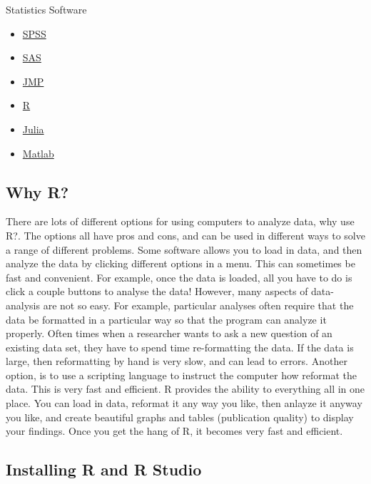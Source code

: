 \documentclass[
]{book}
\providecommand{\tightlist}{%
  \setlength{\itemsep}{0pt}\setlength{\parskip}{0pt}}
\begin{document}
Statistics Software

\begin{itemize}
\tightlist
\item
  \href{http://www-01.ibm.com/software/analytics/spss/}{SPSS}
\item
  \href{http://www.sas.com/en_us/home.html}{SAS}
\item
  \href{http://www.jmp.com}{JMP}
\item
  \href{http://www.r-project.org}{R}
\item
  \href{http://julialang.org}{Julia}
\item
  \href{http://www.mathworks.com/products/matlab/}{Matlab}
\end{itemize}

\hypertarget{why-r}{%
\subsection{Why R?}\label{why-r}}

There are lots of different options for using computers to analyze data, why use R?. The options all have pros and cons, and can be used in different ways to solve a range of different problems. Some software allows you to load in data, and then analyze the data by clicking different options in a menu. This can sometimes be fast and convenient. For example, once the data is loaded, all you have to do is click a couple buttons to analyse the data! However, many aspects of data-analysis are not so easy. For example, particular analyses often require that the data be formatted in a particular way so that the program can analyze it properly. Often times when a researcher wants to ask a new question of an existing data set, they have to spend time re-formatting the data. If the data is large, then reformatting by hand is very slow, and can lead to errors. Another option, is to use a scripting language to instruct the computer how reformat the data. This is very fast and efficient. R provides the ability to everything all in one place. You can load in data, reformat it any way you like, then anlayze it anyway you like, and create beautiful graphs and tables (publication quality) to display your findings. Once you get the hang of R, it becomes very fast and efficient.

\hypertarget{installing-r-and-r-studio}{%
\subsection{Installing R and R Studio}\label{installing-r-and-r-studio}}
\end{document}
